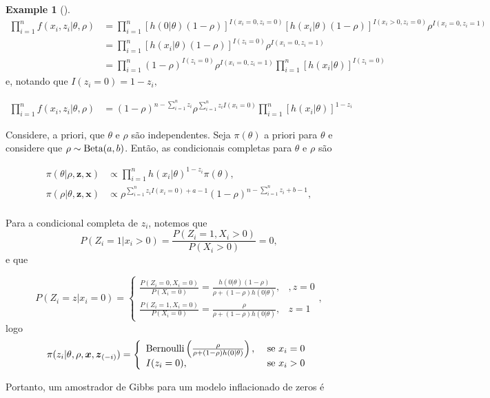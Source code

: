 \documentclass[
  letterpaper,
  DIV=11,
  numbers=noendperiod]{scrreprt}
\theoremstyle{definition}
\theoremstyle{plain}
\theoremstyle{definition}
\newtheorem{example}{Example}[chapter]
\theoremstyle{remark}
\begin{document}
\begin{example}[]
\[\begin{align}
\prod_{i=1}^n f(x_i,z_i|\theta,\rho)&=\prod_{i=1}^n [h(0|\theta)(1-\rho)]^{I(x_i=0,z_i=0)}[h(x_i|\theta)(1-\rho)]^{I(x_i>0,z_i=0)}\rho^{I(x_i=0,z_i=1)}\\
&=\prod_{i=1}^n [h(x_i|\theta)(1-\rho)]^{I(z_i=0)}\rho^{I(x_i=0,z_i=1)}\\
&=\prod_{i=1}^n(1-\rho)^{I(z_i=0)}\rho^{I(x_i=0,z_i=1)}\prod_{i=1}^n [h(x_i|\theta)]^{I(z_i=0)}\end{align}\]
e, notando que \(I(z_i=0)=1-z_i,\)

\[\begin{align}
\prod_{i=1}^n f(x_i,z_i|\theta,\rho)&=
(1-\rho)^{n-\sum_{i=1}^n z_i}\rho^{\sum_{i=1}^n z_iI(x_i=0)}\prod_{i=1}^n [h(x_i|\theta)]^{1-z_i}\end{align}\]

Considere, a priori, que \(\theta\) e \(\rho\) são independentes. Seja
\(\pi(\theta)\) a priori para \(\theta\) e considere que
\(\rho\sim\hbox{Beta}(a,b)\). Então, as condicionais completas para
\(\theta\) e \(\rho\) são

\[\begin{align}
\pi(\theta|\rho,\boldsymbol{z},\boldsymbol{x})&\propto \prod_{i=1}^n h(x_i|\theta)^{1-z_i}\pi(\theta),\\
\pi(\rho|\theta,\boldsymbol{z},\boldsymbol{x})&\propto \rho^{\sum_{i=1}^n z_iI(x_i=0)+a-1}(1-\rho)^{n-\sum_{i=1}^n z_i+b-1},\\
\end{align}\]

Para a condicional completa de \(z_i\), notemos que
\[P(Z_i=1|x_i>0)=\frac{P(Z_i=1,X_i>0)}{P(X_i>0)}=0,\] e que

\[P(Z_i=z|x_i=0)= \left\{\begin{array}{ll}\frac{P(Z_i=0,X_i=0)}{P(X_i=0)}=\frac{h(0|\theta)(1-\rho)}{\rho+(1-\rho)h(0|\theta)},&,z=0\\
\frac{P(Z_i=1,X_i=0)}{P(X_i=0)}=\frac{\rho}{\rho+(1-\rho)h(0|\theta)},&z=1\end{array}\right.,\]
logo
\[\pi(z_i|\theta,\rho,\boldsymbol{x},\boldsymbol{z}_{(-i)})=\left\{\begin{array}{ll}\hbox{Bernoulli}\left( \frac{\rho}{\rho+(1-\rho)h(0|\theta)}\right),&\hbox{ se }x_i=0\\
I(z_i=0),&\hbox{ se } x_i>0\\ \end{array}\right.\]

Portanto, um amostrador de Gibbs para um modelo inflacionado de zeros é


\end{example}
\end{document}
